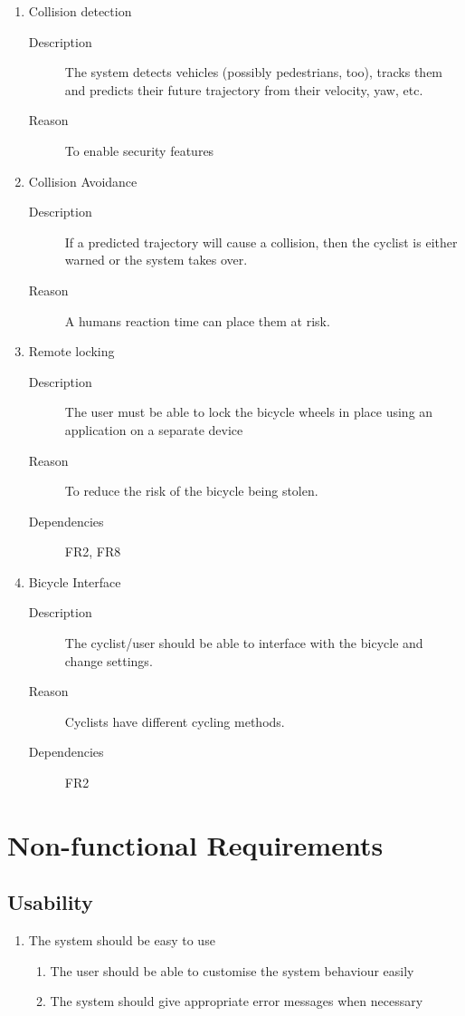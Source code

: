 \documentclass[a4paper]{report}
\begin{document}
\begin{enumerate}[label=\ref*{sec:func_req}.\arabic*.,leftmargin=*]
\item Collision detection
\begin{description}
\item[Description] The system detects vehicles (possibly pedestrians, too), tracks them and predicts their future trajectory from their velocity, yaw, etc.
\item[Reason] To enable security features
\end{description}

\item Collision Avoidance
\begin{description}
\item[Description] If a predicted trajectory will cause a collision, then the cyclist is either warned or the system takes over.
\item[Reason] A humans reaction time can place them at risk.
\end{description}

\item Remote locking
\begin{description}
\item[Description] The user must be able to lock the bicycle wheels in place using an application on a separate device
\item[Reason] To reduce the risk of the bicycle being stolen.
\item[Dependencies] FR2, FR8
\end{description}

\item Bicycle Interface
\begin{description}
\item[Description] The cyclist/user should be able to interface with the bicycle and change settings.
\item[Reason] Cyclists have different cycling methods.
\item[Dependencies] FR2
\end{description}
\end{enumerate}

\section{Non-functional Requirements}
\subsection{Usability}
\label{usability}
\begin{enumerate}[label=\ref*{usability}.\arabic*.,leftmargin=*]
\item The system should be easy to use
\begin{enumerate}[label*=\arabic*.]
\item The user should be able to customise the system behaviour easily
\item The system should give appropriate error messages when necessary
\end{enumerate}
\end{enumerate}
\end{document}
